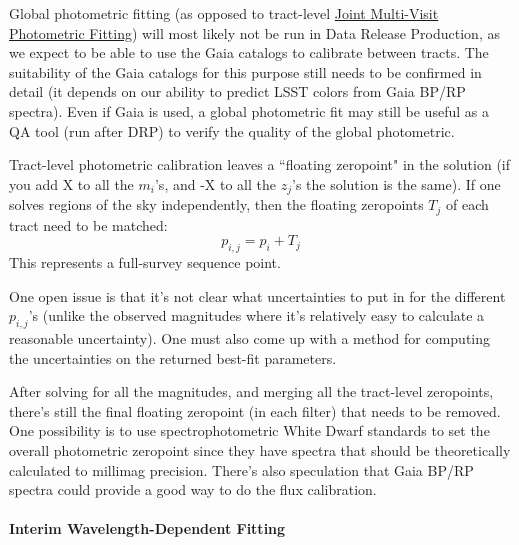 Global photometric fitting (as opposed to tract-level \hyperref[sec:acJointPhotometricFit]{Joint Multi-Visit Photometric Fitting}) will most likely not be run in Data Release Production, as we expect to be able to use the Gaia catalogs to calibrate between tracts.  The suitability of the Gaia catalogs for this purpose still needs to be confirmed in detail (it depends on our ability to predict LSST colors from Gaia BP/RP spectra).  Even if Gaia is used, a global photometric fit may still be useful as a QA tool (run after DRP) to verify the quality of the global photometric.

Tract-level photometric calibration leaves a ``floating zeropoint" in the solution (if you add X to all the $m_i$'s, and -X to all the $z_j$'s the solution is the same).  If one solves regions of the sky independently, then the floating zeropoints $T_j$ of each tract need to be matched:
\begin{equation}
p_{i,j} = p_i + T_j
\end{equation}
This represents a full-survey sequence point.

One open issue is that it's not clear what uncertainties to put in for the different $p_{i,j}$'s (unlike the observed magnitudes where it's relatively easy to calculate a reasonable uncertainty). One must also come up with a method for computing the uncertainties on the returned best-fit parameters.

After solving for all the magnitudes, and merging all the tract-level zeropoints, there's still the final floating zeropoint (in each filter) that needs to be removed.  One possibility is to use spectrophotometric White Dwarf standards to set the overall photometric zeropoint since they have spectra that should be theoretically calculated to millimag precision.  There's also speculation that Gaia BP/RP spectra could provide a good way to do the flux calibration.

\paragraph{Interim Wavelength-Dependent Fitting}
\label{sec:acInterimPhotometricFit}


